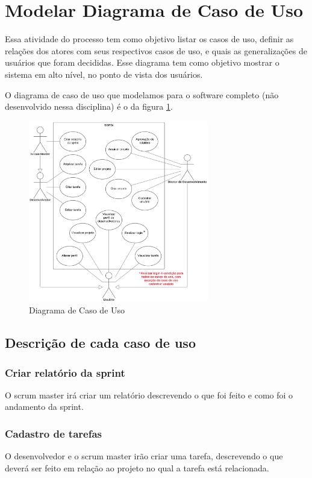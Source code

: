 \section{Modelar Diagrama de Caso de Uso}

Essa atividade do processo tem como objetivo listar os casos de uso, definir as relações dos atores com seus respectivos casos de uso, e quais as generalizações de usuários que foram decididas. Esse diagrama tem como objetivo mostrar o sistema em alto nível, no ponto de vista dos usuários.

O diagrama de caso de uso que modelamos para o software completo (não desenvolvido nessa disciplina) é o da figura \ref{fig:diagrama-caso-uso}.

\begin{figure}[H]
  \center
  \includegraphics[width=0.7\textwidth]{figuras/diagrama-caso-uso.png}
  \caption{Diagrama de Caso de Uso}
  \label{fig:diagrama-caso-uso}
\end{figure}

\subsection{Descrição de cada caso de uso}

\subsubsection{Criar relatório da sprint}
  O scrum master irá criar um relatório descrevendo o que foi feito e como foi o andamento da sprint.
\subsubsection{Cadastro de tarefas}
  O desenvolvedor e o scrum master irão criar uma tarefa, descrevendo o que deverá ser feito em relação ao projeto no qual a tarefa está relacionada.
